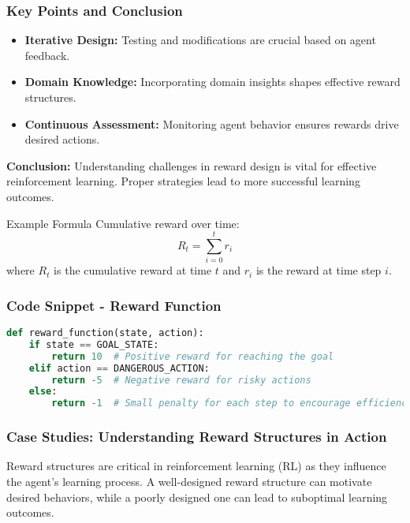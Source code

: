 \documentclass[aspectratio=169]{beamer}
\begin{document}
\begin{frame}[fragile]
    \frametitle{Key Points and Conclusion}
    \begin{itemize}
        \item \textbf{Iterative Design:} Testing and modifications are crucial based on agent feedback.
        \item \textbf{Domain Knowledge:} Incorporating domain insights shapes effective reward structures.
        \item \textbf{Continuous Assessment:} Monitoring agent behavior ensures rewards drive desired actions.
    \end{itemize}
    
    \textbf{Conclusion:} Understanding challenges in reward design is vital for effective reinforcement learning. Proper strategies lead to more successful learning outcomes.
    
    \begin{block}{Example Formula}
        Cumulative reward over time:
        \begin{equation}
            R_t = \sum_{i=0}^{t} r_i
        \end{equation}
        where \( R_t \) is the cumulative reward at time \( t \) and \( r_i \) is the reward at time step \( i \).
    \end{block}
\end{frame}

\begin{frame}[fragile]
    \frametitle{Code Snippet - Reward Function}
    \begin{lstlisting}[language=Python]
def reward_function(state, action):
    if state == GOAL_STATE:
        return 10  # Positive reward for reaching the goal
    elif action == DANGEROUS_ACTION:
        return -5  # Negative reward for risky actions
    else:
        return -1  # Small penalty for each step to encourage efficiency
    \end{lstlisting}
\end{frame}

\begin{frame}[fragile]
    \frametitle{Case Studies: Understanding Reward Structures in Action}
    Reward structures are critical in reinforcement learning (RL) as they influence the agent's learning process. A well-designed reward structure can motivate desired behaviors, while a poorly designed one can lead to suboptimal learning outcomes.
\end{frame}
\end{document}

